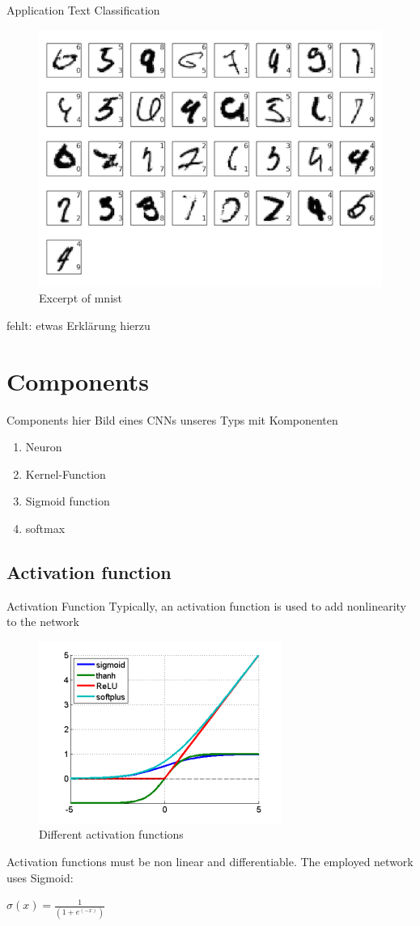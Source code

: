 \documentclass[12pt]{beamer}
\begin{document}
\begin{frame}{Application}
Text Classification
\begin{figure}
\centering
\includegraphics[width = 0.4\linewidth]{images/mnist.png}
\caption{Excerpt of mnist}
\label{fig:principle}
\end{figure}
fehlt: etwas Erklärung hierzu
\end{frame}








\section{Components}
\begin{frame}{Components}
hier Bild eines CNNs unseres Typs mit Komponenten


\begin{enumerate}
\item Neuron
\item Kernel-Function
\item Sigmoid function
\item softmax
\end{enumerate}

\end{frame}
\subsection{Activation function}
\begin{frame}{Activation Function}
Typically, an activation function is used  to add nonlinearity to the network
\begin{figure}
\centering
\includegraphics[width = 0.4\linewidth]{images/activation_functions.png}
\caption{Different activation functions}
\label{fig:principle}
\end{figure}
Activation functions must be non linear and differentiable. \newline
The employed network uses Sigmoid:

$\sigma(x) = \frac{1}{(1+e^(-x))}$



\end{frame}
\end{document}
